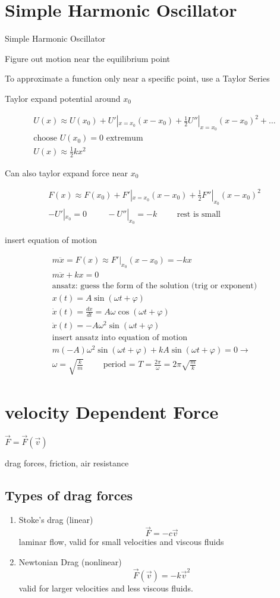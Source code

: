 \documentclass[fleqn]{report}
\newcommand{\hp}{\hspace{1cm}}
\newcommand{\equations} [1] {
\begin{gather*}
#1
\end{gather*}
}
\begin{document}
\section{Simple Harmonic Oscillator}
Simple Harmonic Oscillator

Figure out motion near the equilibrium point

To approximate a function only near a specific point, use a Taylor Series

Taylor expand potential around $x_0$
\equations{
    U(x) \approx U(x_0) + U'|_{x = x_0}(x - x_0) + \frac{1}{2} U''|_{x = x_0} (x - x_0)^2 + \ldots 
    \\
    \textrm{choose $U(x_0) = 0$ extremum}
    \\
    U(x) \approx \frac{1}{2} kx^2
}

Can also taylor expand force near $x_0$
\equations{
    F(x) \approx F(x_0) + F'|_{x = x_0} (x - x_0) + 
    \frac{1}{2} F''|_{x_0} (x - x_0)^2
    \\
    -U'|_{x_0} = 0 \hp -U''|_{x_0} = -k \hp \textrm{rest is small}  
}

\newpage
insert equation of motion 
\equations{
    m \ddot x = F(x) \approx F'|_{x_0} (x - x_0) = -kx
    \\
    m \ddot x + kx = 0
    \\
    \textrm{ansatz: guess the form of the solution (trig or exponent)}
    \\
    x(t) = A \sin(\omega t + \varphi)
    \\
    \dot x(t) = \frac{dx}{dt} = A \omega \cos (\omega t + \varphi)
    \\
    \ddot x(t) = -A \omega^2 \sin(\omega t + \varphi)
    \\
    \textrm{insert ansatz into equation of motion}
    \\
    m (-A) \omega^2 \sin(\omega t + \varphi) + 
    k A \sin(\omega t + \varphi) = 0
    \rightarrow 
    \\
    \omega = \sqrt{\frac{k}{m}}
    \hp
    \textrm{period = } T = \frac{2 \pi }{\omega} = 2 \pi \sqrt{\frac{m}{k}}
}

\section{velocity Dependent Force}
$\vec F = \vec F(\vec v)$

drag forces, friction, air resistance

\subsection{Types of drag forces}
\begin{enumerate}
    \item
    Stoke's drag (linear)
    \[
    \vec F = -c \vec v
    \]
    laminar flow, valid for small velocities and viscous fluids
    \item
    Newtonian Drag (nonlinear)
    \[
    \vec F(\vec v) = -k \vec v^2
    \]
    valid for larger velocities and less viscous fluids.
\end{enumerate}
\end{document}
